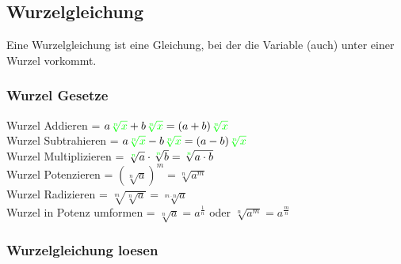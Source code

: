 \begin{multicols}{2}
    \subsection{Wurzelgleichung}
    \vspace{-4mm}
    Eine Wurzelgleichung ist eine Gleichung, bei der die Variable (auch) unter einer Wurzel vorkommt. \\
    \subsubsection{Wurzel Gesetze}
    \vspace{-4mm}
    Wurzel Addieren = $a{\color{green}\sqrt[n]{x}} + b{\color{green}\sqrt[n]{x}} = (a + b){\color{green}\sqrt[n]{x}}$ \\
    Wurzel Subtrahieren = $a {\color{green}\sqrt[n]{x}} - b{\color{green}\sqrt[n]{x}} = (a - b){\color{green}\sqrt[n]{x}}$ \\
    Wurzel Multiplizieren = $\sqrt[{\color{green}n}]{a} \cdot \sqrt[{\color{green}n}]{b} = \sqrt[{\color{green}n}]{a \cdot b}$ \\
    Wurzel Potenzieren = $(\sqrt[n]{a})^m = \sqrt[n]{a^m}$ \\
    Wurzel Radizieren = $\sqrt[m]{\sqrt[n]{a}} = \sqrt[m \cdot n]{a}$ \\
    Wurzel in Potenz umformen = $\sqrt[n]{a} = a^{\frac{1}{n}}$ oder $\sqrt[n]{a^m} = a^{\frac{m}{n}}$ \\
    \subsubsection{Wurzelgleichung loesen}
    \vspace{-4mm}


\end{multicols}
